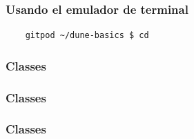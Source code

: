 \documentclass[
	spanish,
	9pt,
	xcolor=table,
	handout,
	aspectratio=1610,
  ignorenonframetext
]{beamer}
\begin{document}
\begin{frame}
  \frametitle{Usando el emulador de terminal}



\end{frame}

\begin{frame}

\end{frame}

\begin{frame}[fragile]
  \begin{lstlisting}
    gitpod ~/dune-basics $ cd
  \end{lstlisting}
\end{frame}


\begin{frame}[fragile]
  \frametitle{Classes}

  


\end{frame}

\begin{frame}[fragile]
  \frametitle{Classes}

  

\end{frame}

\begin{frame}[fragile]
  \frametitle{Classes}

  

\end{frame}
\end{document}
